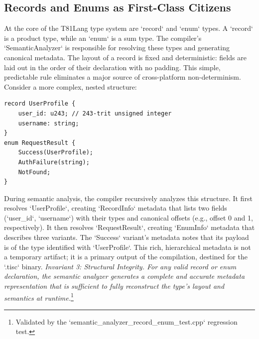 \documentclass[sigconf, 10pt]{acmart}
\begin{document}
\subsection{Records and Enums as First-Class Citizens}
At the core of the T81Lang type system are `record` and `enum` types. A `record` is a product type, while an `enum` is a sum type. The compiler's `SemanticAnalyzer` is responsible for resolving these types and generating canonical metadata. The layout of a record is fixed and deterministic: fields are laid out in the order of their declaration with no padding. This simple, predictable rule eliminates a major source of cross-platform non-determinism.
Consider a more complex, nested structure:
\begin{verbatim}
record UserProfile {
    user_id: u243; // 243-trit unsigned integer
    username: string;
}
enum RequestResult {
    Success(UserProfile);
    AuthFailure(string);
    NotFound;
}
\end{verbatim}
During semantic analysis, the compiler recursively analyzes this structure. It first resolves `UserProfile`, creating `RecordInfo` metadata that lists two fields (`user_id`, `username`) with their types and canonical offsets (e.g., offset 0 and 1, respectively). It then resolves `RequestResult`, creating `EnumInfo` metadata that describes three variants. The `Success` variant's metadata notes that its payload is of the type identified with `UserProfile`. This rich, hierarchical metadata is not a temporary artifact; it is a primary output of the compilation, destined for the `.tisc` binary.
\textit{Invariant 3: Structural Integrity. For any valid record or enum declaration, the semantic analyzer generates a complete and accurate metadata representation that is sufficient to fully reconstruct the type's layout and semantics at runtime.}\footnote{Validated by the `semantic_analyzer_record_enum_test.cpp` regression test.}
\end{document}
